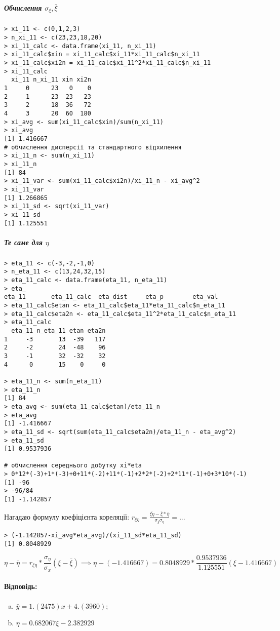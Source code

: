 \documentclass[a4paper, 12pt, oneside]{extarticle}
\newcommand{\Answer}[1]{
\medskip
\null\hfill
\begin{boxedminipage}{\textwidth}
	\paragraph{Відповідь: }{#1}
\end{boxedminipage}
}
\begin{document}
\subparagraph{Обчислення $\sigma_{\xi}, \bar \xi$}
\begin{verbatim}
> xi_11 <- c(0,1,2,3)
> n_xi_11 <- c(23,23,18,20)
> xi_11_calc <- data.frame(xi_11, n_xi_11)
> xi_11_calc$xin = xi_11_calc$xi_11*xi_11_calc$n_xi_11
> xi_11_calc$xi2n = xi_11_calc$xi_11^2*xi_11_calc$n_xi_11
> xi_11_calc
  xi_11 n_xi_11 xin xi2n
1     0      23   0    0
2     1      23  23   23
3     2      18  36   72
4     3      20  60  180
> xi_avg <- sum(xi_11_calc$xin)/sum(n_xi_11)
> xi_avg
[1] 1.416667
# обчислення дисперсії та стандартного відхилення
> xi_11_n <- sum(n_xi_11)
> xi_11_n
[1] 84
> xi_11_var <- sum(xi_11_calc$xi2n)/xi_11_n - xi_avg^2
> xi_11_var
[1] 1.266865
> xi_11_sd <- sqrt(xi_11_var)
> xi_11_sd
[1] 1.125551
\end{verbatim}

\subparagraph{Те саме для $\eta$}

\begin{verbatim}
> eta_11 <- c(-3,-2,-1,0)
> n_eta_11 <- c(13,24,32,15)
> eta_11_calc <- data.frame(eta_11, n_eta_11)
> eta_
eta_11       eta_11_calc  eta_dist     eta_p        eta_val
> eta_11_calc$etan <- eta_11_calc$eta_11*eta_11_calc$n_eta_11
> eta_11_calc$eta2n <- eta_11_calc$eta_11^2*eta_11_calc$n_eta_11
> eta_11_calc
  eta_11 n_eta_11 etan eta2n
1     -3       13  -39   117
2     -2       24  -48    96
3     -1       32  -32    32
4      0       15    0     0

> eta_11_n <- sum(n_eta_11)
> eta_11_n
[1] 84
> eta_avg <- sum(eta_11_calc$etan)/eta_11_n
> eta_avg
[1] -1.416667
> eta_11_sd <- sqrt(sum(eta_11_calc$eta2n)/eta_11_n - eta_avg^2)
> eta_11_sd
[1] 0.9537936

# обчислення середнього добутку xi*eta
> 0*12*(-3)+1*(-3)+0+11*(-2)+11*(-1)+2*2*(-2)+2*11*(-1)+0+3*10*(-1)
[1] -96
> -96/84
[1] -1.142857
\end{verbatim}

Нагадаю формулу коефіцієнта кореляції:
$
r_{{\xi}\eta} = \frac{\overline{{\xi}\eta} - \bar {\xi} * \bar \eta}{\sigma_{\xi}\sigma_\eta}
= ...
$

\begin{verbatim}
> (-1.142857-xi_avg*eta_avg)/(xi_11_sd*eta_11_sd)
[1] 0.8048929
\end{verbatim}

$$
\eta - \bar \eta = r_{\xi\eta} * \frac{\sigma_\eta}{\sigma_x}(\xi-\bar \xi)
\implies
\eta - (-1.416667) = 0.8048929 * \frac{0.9537936}{1.125551}(\xi-1.416667)
$$

\Answer{
	\begin{enumerate}[a)]
		\item
$
\bar y = 1.(2475)x + 4.(3960)
$;

\item
$
\eta = 0.682067\xi-2.382929
$
	\end{enumerate}
}
\end{document}
